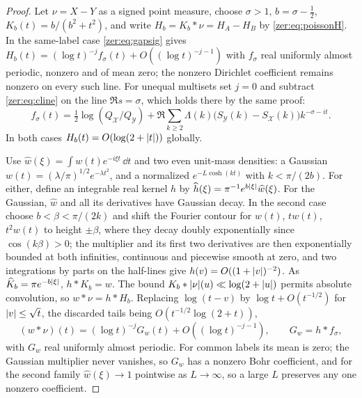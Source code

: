 \begin{proof}
Let $\nu=X-Y$ as a signed point measure, choose $\sigma>1$, $b=\sigma-\tfrac12$, $K_b(t)=b/(b^2+t^2)$, and
write $H_b=K_b*\nu=H_A-H_B$ by \eqref{zer:eq:poissonH}. In the same-label case \eqref{zer:eq:gapsig} gives
$H_b(t)=(\log t)^{-j}f_\sigma(t)+O((\log t)^{-j-1})$ with $f_\sigma$ real uniformly almost periodic, nonzero
and of mean zero; the nonzero Dirichlet coefficient remains nonzero on every such line. For unequal
multisets set $j=0$ and subtract \eqref{zer:eq:cline} on the line $\Re s=\sigma$, which holds there by the
same proof:
\[
 f_\sigma(t)=\tfrac12\log(Q_{\mathcal X}/Q_{\mathcal Y})+\Re\sum_{k\ge2}\Lambda(k)\bigl(S_{\mathcal Y}(k)-S_{\mathcal X}(k)\bigr)k^{-\sigma-it}.
\]
In both cases $H_b(t)=O(\log(2+\lvert t\rvert))$ globally.

Use $\widehat w(\xi)=\int w(t)e^{-i\xi t}\,\dd t$ and two even unit-mass densities: a Gaussian
$w(t)=(\lambda/\pi)^{1/2}e^{-\lambda t^2}$, and a normalized $e^{-L\cosh(kt)}$ with $k<\pi/(2b)$. For either,
define an integrable real kernel $h$ by $\widehat h(\xi)=\pi^{-1}e^{b\lvert\xi\rvert}\widehat w(\xi)$. For the
Gaussian, $\widehat w$ and all its derivatives have Gaussian decay. In the second case choose
$b<\beta<\pi/(2k)$ and shift the Fourier contour for $w(t)$, $tw(t)$, $t^2w(t)$ to height $\pm\beta$, where
they decay doubly exponentially since $\cos(k\beta)>0$; the multiplier and its first two derivatives are
then exponentially bounded at both infinities, continuous and piecewise smooth at zero, and two
integrations by parts on the half-lines give $h(v)=O((1+\lvert v\rvert)^{-2})$. As $\widehat K_b=\pi e^{-b\lvert\xi\rvert}$,
$h*K_b=w$. The bound $K_b*\lvert\nu\rvert(u)\ll\log(2+\lvert u\rvert)$ permits absolute convolution, so $w*\nu=h*H_b$.
Replacing $\log(t-v)$ by $\log t+O(t^{-1/2})$ for $\lvert v\rvert\le\sqrt t$, the discarded tails being
$O(t^{-1/2}\log(2+t))$,
\begin{equation}\label{zer:eq:locsmoothed}
 (w*\nu)(t)=(\log t)^{-j}G_w(t)+O((\log t)^{-j-1}),\qquad G_w=h*f_\sigma ,
\end{equation}
with $G_w$ real uniformly almost periodic. For common labels its mean is zero; the Gaussian multiplier never
vanishes, so $G_w$ has a nonzero Bohr coefficient, and for the second family $\widehat w(\xi)\to1$ pointwise as
$L\to\infty$, so a large $L$ preserves any one nonzero coefficient.


\end{proof}
